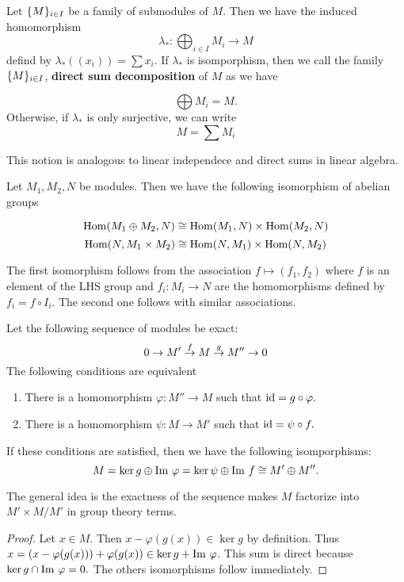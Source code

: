     Let $\{M\}_{i \in I}$ be a family of submodules of $M$. Then we have the induced homomorphism 
    $$\lambda_*: \bigoplus_{i \in I} M_i \to M$$
    defind by $\lambda_*((x_i)) = \sum  x_i$. If $\lambda_*$ is isomporphism, then we call the family $\{M\}_{i \in I}$, \textbf{direct sum decomposition} of $M$ as we have

    $$\bigoplus M_i = M.$$
    Otherwise, if $\lambda_*$ is only surjective, we can write
    $$M = \sum M_i$$
    \begin{remark}
        This notion is analogous to linear independece and direct sums in linear algebra.
    \end{remark}


    Let $M_1, M_2, N$ be modules. Then we have the following isomorphism of abelian groups

    $$\mathrm{Hom}(M_1 \oplus M_2, N) \cong \mathrm{Hom}(M_1, N) \times \mathrm{Hom}(M_2, N)$$
    $$\mathrm{Hom}(N, M_1 \times M_2) \cong \mathrm{Hom}(N, M_1) \times \mathrm{Hom}(N, M_2)$$

    The first isomorphism follows from the association $f \mapsto (f_1, f_2)$ where $f$ is an element of the LHS group and $f_i: M_i \to N$ are the homomorphisms defined by $f_i = f \circ I_i$. The second one follows with similar associations.


    \begin{proposition}
        Let the following sequence of modules be exact:
        $$0 \to M' \overset{f}{\to} M \overset{g}{\to} M'' \to 0$$
        The following conditions are equivalent
        \begin{enumerate}
            \item There is a homomorphism $\varphi: M'' \to M$ such that $\text{id} = g \circ \varphi.$
            \item There is a homomorphism $\psi: M \to M'$ such that $\text{id} = \psi \circ f.$
        \end{enumerate}
        If these conditions are satisfied, then we have the following isomporphisms:
        $$M = \ker g \oplus \mathrm{Im}\  \varphi = \ker \psi \oplus \mathrm{Im}\  f \cong M' \oplus M''.$$
    \end{proposition}

    The general idea is the exactness of the sequence makes $M$ factorize into $M' \times M/M'$ in group theory terms.
    \begin{proof}
        Let $x \in M$. Then $x - \varphi(g(x)) \in \ker g$ by definition. Thus $x = (x - \varphi(g(x))) + \varphi(g(x)) \in \ker g + \mathrm{Im}\  \varphi$. This sum is direct because $\ker g \cap \mathrm{Im}\  \varphi = 0.$ The others isomorphisms follow immediately.
    \end{proof}


